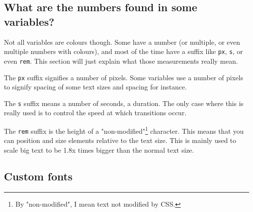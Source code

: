 \documentclass{article}
\begin{document}
\subsection{What are the numbers found in some variables?}

Not all variables are colours though. Some have a number (or multiple, or even multiple numbers with colours), and most of the time have a suffix like \texttt{px}, \texttt{s}, or even \texttt{rem}. This section will just explain what those measurements really mean.

The \texttt{px} suffix signifies a number of pixels. Some variables use a number of pixels to signify spacing of some text sizes and spacing for instance.

The \texttt{s} suffix means a number of seconds, a duration. The only case where this is really used is to control the speed at which transitions occur.

The \texttt{rem} suffix is the height of a "non-modified"\footnote{By "non-modified", I mean text not modified by CSS.} character. This means that you can position and size elements relative to the text size. This is mainly used to scale big text to be 1.8x times bigger than the normal text size.

\subsection{Custom fonts}
\end{document}

